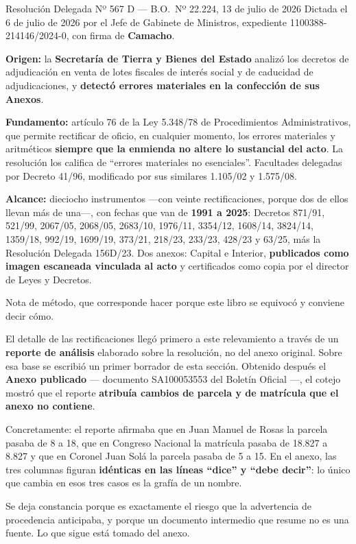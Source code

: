 \begin{ficha}{Resolución Delegada Nº 567 D --- B.O.\ Nº 22.224, 13 de julio de 2026}
Dictada el 6 de julio de 2026 por el Jefe de Gabinete de Ministros, expediente 1100388-214146/2024-0, con firma de \textbf{Camacho}.

\textbf{Origen:} la \textbf{Secretaría de Tierra y Bienes del Estado} analizó los decretos de adjudicación en venta de lotes fiscales de interés social y de caducidad de adjudicaciones, y \textbf{detectó errores materiales en la confección de sus Anexos}.

\textbf{Fundamento:} artículo 76 de la Ley 5.348/78 de Procedimientos Administrativos, que permite rectificar de oficio, en cualquier momento, los errores materiales y aritméticos \textbf{siempre que la enmienda no altere lo sustancial del acto}. La resolución los califica de ``errores materiales no esenciales''. Facultades delegadas por Decreto 41/96, modificado por sus similares 1.105/02 y 1.575/08.

\textbf{Alcance:} dieciocho instrumentos ---con veinte rectificaciones, porque dos de ellos llevan más de una---, con fechas que van de \textbf{1991 a 2025}: Decretos 871/91, 521/99, 2067/05, 2068/05, 2683/10, 1976/11, 3354/12, 1608/14, 3824/14, 1359/18, 992/19, 1699/19, 373/21, 218/23, 233/23, 428/23 y 63/25, más la Resolución Delegada 156D/23. Dos anexos: Capital e Interior, \textbf{publicados como imagen escaneada vinculada al acto} y certificados como copia por el director de Leyes y Decretos.
\end{ficha}

\begin{cautela}
Nota de método, que corresponde hacer porque este libro se equivocó y conviene decir cómo.

El detalle de las rectificaciones llegó primero a este relevamiento a través de un \textbf{reporte de análisis} elaborado sobre la resolución, no del anexo original. Sobre esa base se escribió un primer borrador de esta sección. Obtenido después el \textbf{Anexo publicado} --- documento SA100053553 del Boletín Oficial ---, el cotejo mostró que el reporte \textbf{atribuía cambios de parcela y de matrícula que el anexo no contiene}.

Concretamente: el reporte afirmaba que en Juan Manuel de Rosas la parcela pasaba de 8 a 18, que en Congreso Nacional la matrícula pasaba de 18.827 a 8.827 y que en Coronel Juan Solá la parcela pasaba de 5 a 15. En el anexo, las tres columnas figuran \textbf{idénticas en las líneas ``dice'' y ``debe decir''}: lo único que cambia en esos tres casos es la grafía de un nombre.

Se deja constancia porque es exactamente el riesgo que la advertencia de procedencia anticipaba, y porque un documento intermedio que resume no es una fuente. Lo que sigue está tomado del anexo.
\end{cautela}

